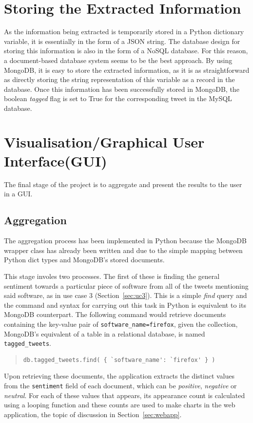 \section{Storing the Extracted Information}
As the information being extracted is temporarily stored in a Python dictionary variable, it is essentially in the form of a JSON string. The database design for storing this information is also in the form of a NoSQL database. For this reason, a document-based database system seems to be the best approach. By using MongoDB, it is easy to store the extracted information, as it is as straightforward as directly storing the string representation of this variable as a record in the database. Once this information has been successfully stored in MongoDB, the boolean \emph{tagged} flag is set to True for the corresponding tweet in the MySQL database.

\section[Visualisation]{Visualisation/Graphical User Interface(GUI)}
The final stage of the project is to aggregate and present the results to the user in a GUI.

\subsection{Aggregation}
The aggregation process has been implemented in Python because the MongoDB wrapper class has already been written and due to the simple mapping between Python dict types and MongoDB's stored documents.

This stage involes two processes. The first of these is finding the general sentiment towards a particular piece of software from all of the tweets mentioning said software, as in use case 3 (Section~\ref{sec:uc3}). This is a simple \emph{find} query and the command and syntax for carrying out this task in Python is equivalent to its MongoDB counterpart. The following command would retrieve documents containing the key-value pair of \texttt{software\_name=firefox}, given the collection, MongoDB's equivalent of a table in a relational database, is named \texttt{tagged\_tweets}.
\begin{quote} 
\begin{lstlisting}
db.tagged_tweets.find( { `software_name': `firefox' } )
\end{lstlisting}
\end{quote}

Upon retrieving these documents, the application extracts the distinct values from the \texttt{sentiment} field of each document, which can be \emph{positive}, \emph{negative} or \emph{neutral}. For each of these values that appears, its appearance count is calculated using a looping function and these counts are used to make charts in the web application, the topic of discussion in Section~\ref{sec:webapp}.

